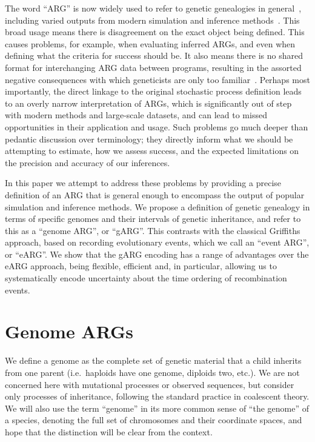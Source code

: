 \documentclass{article}
\begin{document}
The word ``ARG'' is now widely used to refer to genetic genealogies in
general~\citep[MORE][]{mathieson2020ancestry}, including
varied outputs from modern simulation and
inference methods~\citep{rasmussen2014genome, palamara2016argon, haller2018tree,
kelleher2019inferring, speidel2019method, baumdicker2021efficient, zhang2023biobank}.
This broad usage means there is disagreement on the
exact object being defined. This causes problems, for example,
when evaluating inferred ARGs, and even when defining
what the criteria for success should be.
It also means there is no shared format for interchanging ARG data between
programs, resulting in the assorted negative consequences with which
geneticists are only too familiar~\citep{excoffier2006computer}.
Perhaps most importantly, the direct linkage to
the original stochastic process definition leads to an
overly narrow interpretation of ARGs, which is significantly
out of step with modern methods and large-scale datasets, and
can lead to missed opportunities in their application and usage.
Such problems go much deeper than pedantic discussion over terminology;
they directly inform what we should be attempting to estimate, how we
assess success, and the expected limitations on the precision
and accuracy of our inferences.

In this paper we attempt to address these problems by
providing a precise definition of an ARG that is general enough to encompass
the output of popular simulation and inference methods.
We propose a definition of genetic genealogy in terms of specific genomes
and their intervals of genetic inheritance, and refer to this as
a ``genome ARG'', or ``gARG''.
This contrasts with the classical Griffiths approach,
based on recording evolutionary events, which we call
an ``event ARG'', or ``eARG''.
We show that the gARG encoding has a range of advantages over the
eARG approach, being flexible, efficient and, in particular,
allowing us to systematically encode uncertainty about the
time ordering of recombination events.

\section*{Genome ARGs}
We define a genome as the complete set of genetic material that a child
inherits from one parent (i.e.\ haploids have one genome, diploids two, etc.).
We are not concerned here with mutational processes or observed sequences,
but consider only processes of inheritance,
following the standard practice in coalescent theory.
We will also use the term ``genome'' in its
more common sense of ``the genome'' of a species, denoting the full set
of chromosomes and their coordinate spaces, and hope that the distinction
will be clear from the context.
\end{document}
